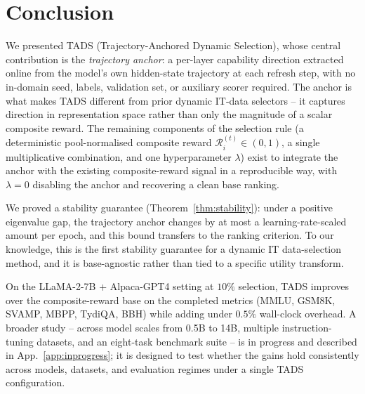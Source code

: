 \section{Conclusion}
\label{sec:conclusion}

We presented \textsc{TADS} (Trajectory-Anchored Dynamic Selection),
whose central contribution is the \emph{trajectory anchor}: a
per-layer capability direction extracted online from the model's
own hidden-state trajectory at each refresh step, with no
in-domain seed, labels, validation set, or auxiliary scorer
required. The anchor is what makes \textsc{TADS} different from
prior dynamic IT-data selectors -- it captures direction in
representation space rather than only the magnitude of a scalar
composite reward. The remaining components of the selection rule
(a deterministic pool-normalised composite reward
$\mathcal{R}_i^{(t)} \in (0,1)$, a single multiplicative
combination, and one hyperparameter $\lambda$) exist to integrate
the anchor with the existing composite-reward signal in a
reproducible way, with $\lambda{=}0$ disabling the anchor and
recovering a clean base ranking.

We proved a stability guarantee (Theorem~\ref{thm:stability}):
under a positive eigenvalue gap, the trajectory anchor changes by
at most a learning-rate-scaled amount per epoch, and this bound
transfers to the ranking criterion. To our knowledge, this is the
first stability guarantee for a dynamic IT data-selection method,
and it is base-agnostic rather than tied to a specific utility
transform.

On the LLaMA-2-7B + Alpaca-GPT4 setting at $10\%$ selection,
\textsc{TADS} improves over the composite-reward base on the
completed metrics (MMLU, GSM8K, SVAMP, MBPP, TydiQA, BBH) while
adding under $0.5\%$ wall-clock overhead. A broader study --
across model scales from 0.5B to 14B, multiple instruction-tuning
datasets, and an eight-task benchmark suite -- is in progress and
described in App.~\ref{app:inprogress}; it is designed to test
whether the gains hold consistently across models, datasets, and
evaluation regimes under a single \textsc{TADS} configuration.
